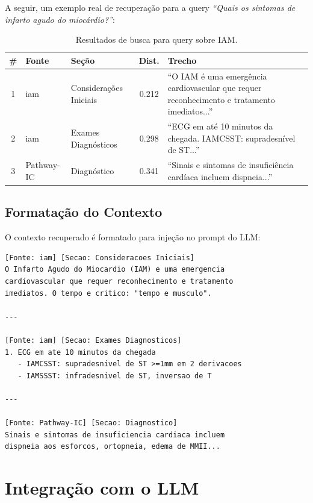 A seguir, um exemplo real de recuperação para a query \textit{``Quais os sintomas de infarto agudo do miocárdio?''}:

\begin{table}[H]
\centering
\caption{Resultados de busca para query sobre IAM.}
\label{tab:exemplo_busca}
\small
\begin{tabularx}{\textwidth}{c l l c X}
\toprule
\textbf{\#} & \textbf{Fonte} & \textbf{Seção} & \textbf{Dist.} & \textbf{Trecho} \\
\midrule
1 & iam & Considerações Iniciais & 0.212 & ``O IAM é uma emergência cardiovascular que requer reconhecimento e tratamento imediatos...'' \\
2 & iam & Exames Diagnósticos & 0.298 & ``ECG em até 10 minutos da chegada. IAMCSST: supradesnível de ST...'' \\
3 & Pathway-IC & Diagnóstico & 0.341 & ``Sinais e sintomas de insuficiência cardíaca incluem dispneia...'' \\
\bottomrule
\end{tabularx}
\end{table}

\subsection{Formatação do Contexto}

O contexto recuperado é formatado para injeção no prompt do LLM:

\begin{lstlisting}[caption={Exemplo de contexto formatado para o prompt.}]
[Fonte: iam] [Secao: Consideracoes Iniciais]
O Infarto Agudo do Miocardio (IAM) e uma emergencia
cardiovascular que requer reconhecimento e tratamento
imediatos. O tempo e critico: "tempo e musculo".

---

[Fonte: iam] [Secao: Exames Diagnosticos]
1. ECG em ate 10 minutos da chegada
   - IAMCSST: supradesnivel de ST >=1mm em 2 derivacoes
   - IAMSSST: infradesnivel de ST, inversao de T

---

[Fonte: Pathway-IC] [Secao: Diagnostico]
Sinais e sintomas de insuficiencia cardiaca incluem
dispneia aos esforcos, ortopneia, edema de MMII...
\end{lstlisting}

\section{Integração com o LLM}

